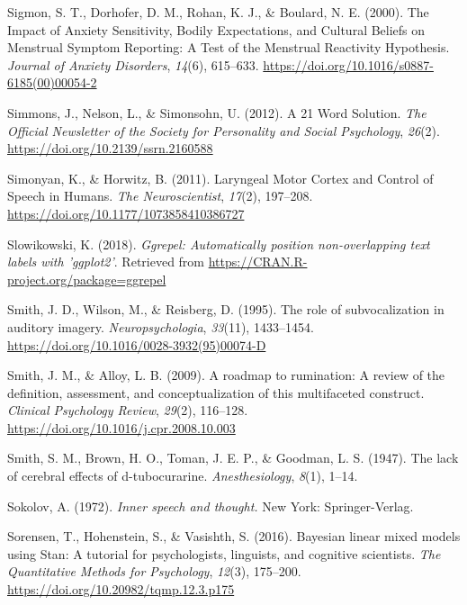 \documentclass[a4paper,12pt,twoside,openright,oldfontcommands]{memoir}
\begin{document}
\leavevmode\hypertarget{ref-sigmon_impact_2000}{}%
Sigmon, S. T., Dorhofer, D. M., Rohan, K. J., \& Boulard, N. E. (2000). The Impact of Anxiety Sensitivity, Bodily Expectations, and Cultural Beliefs on Menstrual Symptom Reporting: A Test of the Menstrual Reactivity Hypothesis. \emph{Journal of Anxiety Disorders}, \emph{14}(6), 615--633. \url{https://doi.org/10.1016/s0887-6185(00)00054-2}

\leavevmode\hypertarget{ref-simmons_21_2012}{}%
Simmons, J., Nelson, L., \& Simonsohn, U. (2012). A 21 Word Solution. \emph{The Official Newsletter of the Society for Personality and Social Psychology}, \emph{26}(2). \url{https://doi.org/10.2139/ssrn.2160588}

\leavevmode\hypertarget{ref-simonyan_laryngeal_2011}{}%
Simonyan, K., \& Horwitz, B. (2011). Laryngeal Motor Cortex and Control of Speech in Humans. \emph{The Neuroscientist}, \emph{17}(2), 197--208. \url{https://doi.org/10.1177/1073858410386727}

\leavevmode\hypertarget{ref-R-ggrepel}{}%
Slowikowski, K. (2018). \emph{Ggrepel: Automatically position non-overlapping text labels with 'ggplot2'}. Retrieved from \url{https://CRAN.R-project.org/package=ggrepel}

\leavevmode\hypertarget{ref-smith_role_1995}{}%
Smith, J. D., Wilson, M., \& Reisberg, D. (1995). The role of subvocalization in auditory imagery. \emph{Neuropsychologia}, \emph{33}(11), 1433--1454. \url{https://doi.org/10.1016/0028-3932(95)00074-D}

\leavevmode\hypertarget{ref-Smith2009}{}%
Smith, J. M., \& Alloy, L. B. (2009). A roadmap to rumination: A review of the definition, assessment, and conceptualization of this multifaceted construct. \emph{Clinical Psychology Review}, \emph{29}(2), 116--128. \url{https://doi.org/10.1016/j.cpr.2008.10.003}

\leavevmode\hypertarget{ref-smith_lack_1947}{}%
Smith, S. M., Brown, H. O., Toman, J. E. P., \& Goodman, L. S. (1947). The lack of cerebral effects of d-tubocurarine. \emph{Anesthesiology}, \emph{8}(1), 1--14.

\leavevmode\hypertarget{ref-sokolov_inner_1972}{}%
Sokolov, A. (1972). \emph{Inner speech and thought.} New York: Springer-Verlag.

\leavevmode\hypertarget{ref-sorensen_bayesian_2016}{}%
Sorensen, T., Hohenstein, S., \& Vasishth, S. (2016). Bayesian linear mixed models using Stan: A tutorial for psychologists, linguists, and cognitive scientists. \emph{The Quantitative Methods for Psychology}, \emph{12}(3), 175--200. \url{https://doi.org/10.20982/tqmp.12.3.p175}
\end{document}
